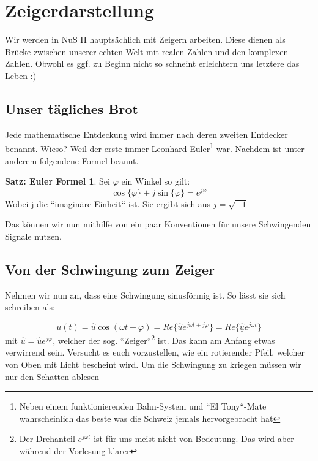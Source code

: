 \documentclass[11pt,a4paper]{article}
\begin{document}
\section{Zeigerdarstellung}
Wir werden in NuS II hauptsächlich mit Zeigern arbeiten. Diese dienen als Brücke zwischen unserer echten Welt mit realen Zahlen und den komplexen Zahlen. Obwohl es ggf. zu Beginn nicht so schneint erleichtern uns letztere das Leben :)

\subsection{Unser tägliches Brot}
Jede mathematische Entdeckung wird immer nach deren zweiten Entdecker benannt. Wieso? Weil der erste immer Leonhard  Euler\footnote{Neben einem funktionierenden Bahn-System und ``El Tony``-Mate wahrscheinlich das beste was die Schweiz jemals hervorgebracht hat} war. Nachdem ist unter anderem folgendene Formel beannt.






\theoremstyle{definition}
\newtheorem*{definition}{Satz: Euler Formel}
\begin{definition}
Sei $\varphi$ ein Winkel so gilt:
\[
\cos\{\varphi\} + j \sin\{\varphi\} = e^{j\varphi}
\]
Wobei j die ``imaginäre Einheit`` ist. Sie ergibt sich aus $j = \sqrt{-1}$
\end{definition}

\noindent Das können wir nun mithilfe von ein paar Konventionen für unsere Schwingenden Signale nutzen.

\subsection{Von der Schwingung zum Zeiger}

Nehmen wir nun an, dass eine Schwingung sinusförmig ist. So lässt sie sich schreiben als:

\[
u(t) = \hat{u}\cos(\omega t + \varphi) = Re\{\hat{u}e^{j\omega t + j\varphi}\} = Re\{\hat{\underline{u}} e^{j\omega t}\} 
\] mit $\hat{\underline{u}} = \hat{u} e^{j\varphi}$, welcher der sog. ``Zeiger``\footnote{Der Drehanteil $ e^{j\omega t}$ ist für uns meist nicht von Bedeutung. Das wird aber während der Vorlesung klarer} ist.
\vspace{0.3cm}
\newline
Das kann am Anfang etwas verwirrend sein. Versucht es euch vorzustellen, wie ein rotierender Pfeil, welcher von Oben mit Licht bescheint wird. Um die Schwingung zu kriegen müssen wir nur den Schatten ablesen
\end{document}
